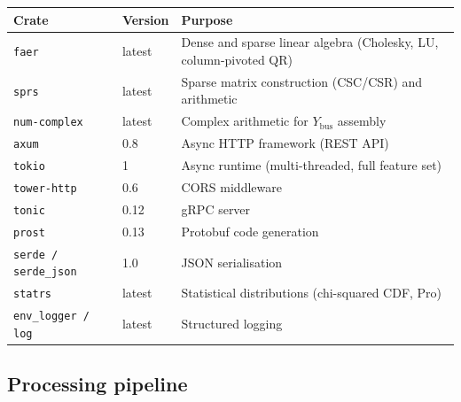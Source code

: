 \documentclass[11pt,a4paper]{article}
\begin{document}
\begin{center}
\small
\begin{tabular}{lll}
  \toprule
  \textbf{Crate} & \textbf{Version} & \textbf{Purpose} \\
  \midrule
  \texttt{faer}        & latest & Dense and sparse linear algebra
    (Cholesky, LU, column-pivoted QR) \\
  \texttt{sprs}        & latest & Sparse matrix construction (CSC/CSR)
    and arithmetic \\
  \texttt{num-complex}  & latest & Complex arithmetic for
    $Y_\text{bus}$ assembly \\
  \texttt{axum}        & 0.8    & Async HTTP framework (REST API) \\
  \texttt{tokio}       & 1      & Async runtime (multi-threaded, full
    feature set) \\
  \texttt{tower-http}  & 0.6    & CORS middleware \\
  \texttt{tonic}       & 0.12   & gRPC server \\
  \texttt{prost}       & 0.13   & Protobuf code generation \\
  \texttt{serde / serde\_json} & 1.0 & JSON serialisation \\
  \texttt{statrs}      & latest & Statistical distributions
    (chi-squared CDF, Pro) \\
  \texttt{env\_logger / log} & latest & Structured logging \\
  \bottomrule
\end{tabular}
\end{center}

\subsection{Processing pipeline}\label{sec:pipeline}
\end{document}
